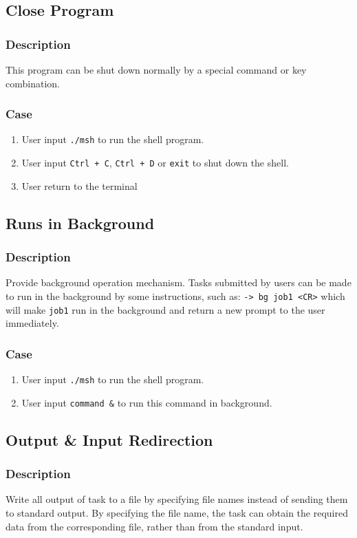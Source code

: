 \documentclass{article}
\begin{document}
\subsection{Close Program}
\subsubsection{Description}
This program can be shut down normally by a special command or key combination.

\subsubsection{Case}
\begin{enumerate}
\item User input \verb|./msh| to run the shell program.
\item User input \verb|Ctrl + C|, \verb|Ctrl + D| or \verb|exit| to shut down the shell.
\item User return to the terminal
\end{enumerate}

\subsection{Runs in Background}
\subsubsection{Description}
Provide background operation mechanism. Tasks submitted by users can be made to run in the background by some instructions, such as: \verb|-> bg job1 <CR>| which will make \verb|job1| run in the background and return a new prompt to the user immediately.

\subsubsection{Case}
\begin{enumerate}
\item User input \verb|./msh| to run the shell program.
\item User input \verb|command &| to run this command in background.
\end{enumerate}

\subsection{Output \& Input Redirection}
\subsubsection{Description}
Write all output of task to a file by specifying file names instead of sending them to standard output.
By specifying the file name, the task can obtain the required data from the corresponding file, rather than from the standard input.
\end{document}
